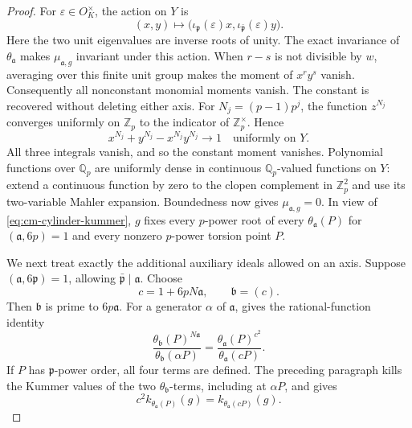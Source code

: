 \documentclass[11pt]{article}
\theoremstyle{definition}\newtheorem{definition}[theorem]{Definition}
\begin{document}
\begin{proof}
For \(\varepsilon\in O_K^\times\), the action on \(Y\) is
\[
 (x,y)\longmapsto
        \bigl(\iota_{\mathfrak p}(\varepsilon)x,
              \iota_{\bar{\mathfrak p}}(\varepsilon)y\bigr).
\]
Here the two unit eigenvalues are inverse roots of unity.
The exact invariance of \(\theta_{\mathfrak a}\) makes
\(\mu_{\mathfrak a,g}\) invariant under this action.
When \(r-s\) is not divisible by \(w\), averaging over this finite
unit group makes the moment of \(x^ry^s\) vanish.
Consequently all nonconstant monomial moments vanish.
The constant is recovered without deleting either axis.
For \(N_j=(p-1)p^j\), the function \(z^{N_j}\) converges uniformly
on \(\mathbb Z_p\) to the indicator of \(\mathbb Z_p^\times\).
Hence
\[
             x^{N_j}+y^{N_j}-x^{N_j}y^{N_j}
                         \longrightarrow1\quad\text{uniformly on }Y.
\]
All three integrals vanish, and so the constant moment vanishes.
Polynomial functions over \(\mathbb Q_p\) are uniformly dense in
continuous \(\mathbb Q_p\)-valued functions on \(Y\):
extend a continuous function by zero to the clopen complement in
\(\mathbb Z_p^2\) and use its two-variable Mahler expansion.
Boundedness now gives \(\mu_{\mathfrak a,g}=0\).
In view of \eqref{eq:cm-cylinder-kummer}, \(g\) fixes every \(p\)-power
root of every \(\theta_{\mathfrak a}(P)\) for
\((\mathfrak a,6p)=1\) and every nonzero \(p\)-power torsion point
\(P\).

We next treat exactly the additional auxiliary ideals allowed on
an axis.  Suppose \((\mathfrak a,6\mathfrak p)=1\), allowing
\(\bar{\mathfrak p}\mid\mathfrak a\).
Choose
\[
              c=1+6pN\mathfrak a,\qquad \mathfrak b=(c).
\]
Then \(\mathfrak b\) is prime to \(6p\mathfrak a\).
For a generator \(\alpha\) of \(\mathfrak a\),
\cite[Lemma 2.4, p.~7]{IshiiSoule} gives the rational-function
identity
\[
 \frac{\theta_{\mathfrak b}(P)^{N\mathfrak a}}
      {\theta_{\mathfrak b}(\alpha P)}
 =
 \frac{\theta_{\mathfrak a}(P)^{c^2}}
      {\theta_{\mathfrak a}(cP)}.
\]
If \(P\) has \(\mathfrak p\)-power order, all four terms are defined.
The preceding paragraph kills the Kummer values of the two
\(\theta_{\mathfrak b}\)-terms, including at \(\alpha P\), and gives
\begin{equation}\label{eq:cm-auxiliary-axis}
 c^2 k_{\theta_{\mathfrak a}(P)}(g)
                      =k_{\theta_{\mathfrak a}(cP)}(g).
\end{equation}


\end{proof}
\end{document}
